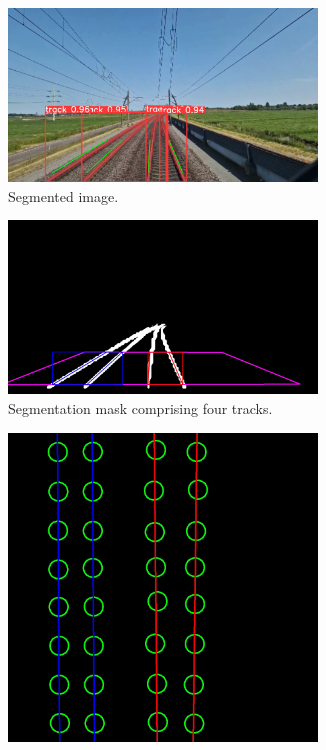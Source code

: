 \documentclass[Master,MDS,english]{BASE/twbook} %
\begin{document}
\begin{figure}
\centering
\begin{subfigure}[t]{.395\textwidth}
  \centering
  \includegraphics[width=0.9\textwidth]{images/streaming/img3}
  \caption{Segmented image.}
\end{subfigure}%
\begin{subfigure}[t]{.395\textwidth}
  \centering
  \includegraphics[width=0.9\textwidth]{images/streaming/img2}
  \caption{Segmentation mask comprising four tracks.}
\end{subfigure}%
\begin{subfigure}[t]{.215\textwidth}
  \centering
  \includegraphics[width=0.9\textwidth]{images/streaming/img1}

\end{subfigure}
\end{figure}
\end{document}
